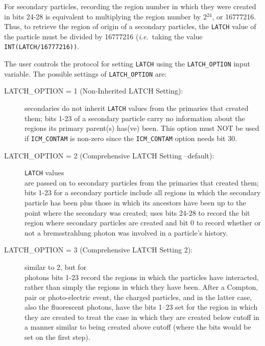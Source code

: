 \documentclass[12pt,twoside]{article}
\newcommand{\ie}{{\em i.e.}}
\begin{document}
For secondary particles, recording the region number in which they were
created in bits 24-28 is equivalent to multiplying the region number by
2$^{24}$, or 16777216.  Thus, to retrieve the region of origin of a
secondary particles, the \verb+LATCH+ value of the particle must be divided by
16777216 (\ie\ taking the value \verb+INT(LATCH/16777216))+.

The user controls the protocol for setting \verb+LATCH+ using the
\verb+LATCH_OPTION+
input variable.  The possible settings of
\verb+LATCH_OPTION+ are:
\begin{description}

\item [LATCH\_OPTION = 1 (Non-Inherited LATCH Setting):]
secondaries do not inherit \verb+LATCH+
values from the primaries that created them;
bits 1-23 of a secondary particle carry no information about the
regions its primary parent(s) has(ve) been.  This option must NOT be
used if \verb+ICM_CONTAM+ is non-zero since the \verb+ICM_CONTAM+ option
needs bit 30. 
\item [LATCH\_OPTION = 2 (Comprehensive LATCH Setting --default):]
\verb+LATCH+ values\\ are passed on to
secondary particles from the primaries that created them; bits 1-23
for a secondary particle include all regions in which the secondary
particle has been plus those in which its ancestors have been
up to the point where the secondary was created;  uses
bits 24-28 to record the bit region
where secondary particles are created and bit 0 to
record whether or not a bremsstrahlung photon was involved in a
 
particle's history.
\item [LATCH\_OPTION = 3 (Comprehensive LATCH Setting 2):]
similar to 2, but for\\ photons
bits 1-23 record the regions in which the particles have interacted,
rather than simply the regions in which they have been. After a Compton,
pair or photo-electric event, the charged particles, and in the latter
case, also the fluorescent photons, have the bits 1--23 set for the region
in which they are created to treat the case in which they are created
below cutoff in a manner similar to being created above cutoff (where the
bits would be set on the first step).
\end{description}
\end{document}

